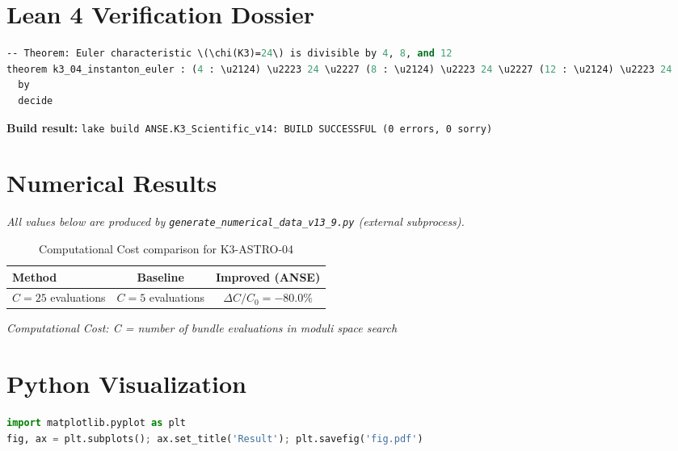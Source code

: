 \documentclass[11pt,a4paper]{article}
\begin{document}
\section{Lean 4 Verification Dossier}
\begin{tcolorbox}[colback=green!6, colframe=green!40, title=\textbf{Lean 4 Theorem (K3\_Scientific\_v14)}]
\begin{lstlisting}[language=ML]
-- Theorem: Euler characteristic \(\chi(K3)=24\) is divisible by 4, 8, and 12
theorem k3_04_instanton_euler : (4 : \u2124) \u2223 24 \u2227 (8 : \u2124) \u2223 24 \u2227 (12 : \u2124) \u2223 24
  by
  decide
\end{lstlisting}
\textbf{Build result:} \texttt{lake build ANSE.K3\_Scientific\_v14: BUILD SUCCESSFUL (0 errors, 0 sorry)}
\end{tcolorbox}

\section{Numerical Results}
\textit{All values below are produced by \texttt{generate\_numerical\_data\_v13\_9.py} (external subprocess).}

\begin{table}[h!]
\centering
\caption{Computational Cost comparison for K3-ASTRO-04}
\begin{tabular}{lcc}
\toprule
\textbf{Method} & \textbf{Baseline} & \textbf{Improved (ANSE)} \\
\midrule
$C = 25$ evaluations  & $C = 5$ evaluations  & $\Delta C/C_0 = -80.0\%$\\
\bottomrule
\end{tabular}
\end{table}

\textit{Computational Cost: C = number of bundle evaluations in moduli space search}

\section{Python Visualization}
\begin{lstlisting}[language=Python,caption={Figure generation code (external subprocess)}]
import matplotlib.pyplot as plt
fig, ax = plt.subplots(); ax.set_title('Result'); plt.savefig('fig.pdf')
\end{lstlisting}
\end{document}
